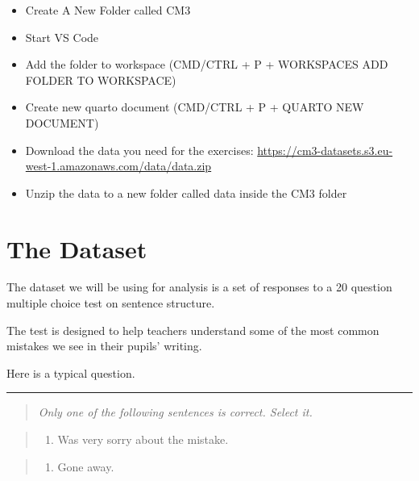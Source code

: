 \documentclass[
  letterpaper,
  DIV=11,
  numbers=noendperiod]{scrreprt}
\providecommand{\tightlist}{%
  \setlength{\itemsep}{0pt}\setlength{\parskip}{0pt}}\usepackage{longtable,booktabs,array}
\begin{document}
\begin{itemize}
\tightlist
\item
  Create A New Folder called CM3
\item
  Start VS Code
\item
  Add the folder to workspace (CMD/CTRL + P + WORKSPACES ADD FOLDER TO
  WORKSPACE)
\item
  Create new quarto document (CMD/CTRL + P + QUARTO NEW DOCUMENT)
\item
  Download the data you need for the exercises:
  \url{https://cm3-datasets.s3.eu-west-1.amazonaws.com/data/data.zip}
\item
  Unzip the data to a new folder called data inside the CM3 folder
\end{itemize}

\hypertarget{the-dataset}{%
\chapter{The Dataset}\label{the-dataset}}

The dataset we will be using for analysis is a set of responses to a 20
question multiple choice test on sentence structure.

The test is designed to help teachers understand some of the most common
mistakes we see in their pupils' writing.

Here is a typical question.

\begin{center}\rule{0.5\linewidth}{0.5pt}\end{center}

\begin{quote}
\emph{Only one of the following sentences is correct. Select it.}
\end{quote}

\begin{quote}
\begin{enumerate}
\def\labelenumi{\Alph{enumi})}
\tightlist
\item
  Was very sorry about the mistake.
\end{enumerate}
\end{quote}

\begin{quote}
\begin{enumerate}
\def\labelenumi{\Alph{enumi})}
\setcounter{enumi}{1}
\tightlist
\item
  Gone away.
\end{enumerate}
\end{quote}
\end{document}
